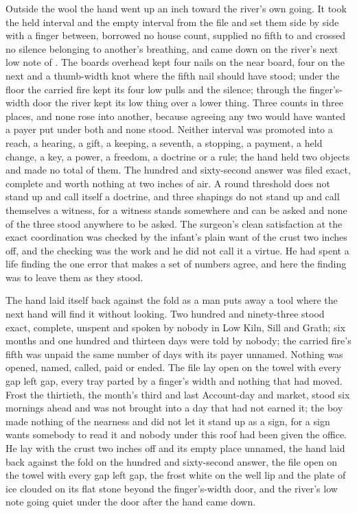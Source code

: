 \scenebreak

Outside the wool the hand went up an inch toward the river's own going. It took the held interval and the empty interval from the file and set them side by side with a finger between, borrowed no house count, supplied no fifth to  and crossed no silence belonging to another's breathing, and came down on the river's next low note of . The boards overhead kept four nails on the near board, four on the next and a thumb-width knot where the fifth nail should have stood; under the floor the carried fire kept its four low pulls and the silence; through the finger's-width door the river kept its low thing over a lower thing. Three counts in three places, and none rose into another, because agreeing any two would have wanted a payer put under both and none stood. Neither interval was promoted into a reach, a hearing, a gift, a keeping, a seventh, a stopping, a payment, a held change, a key, a power, a freedom, a doctrine or a rule; the hand held two objects and made no total of them. The hundred and sixty-second answer was filed exact, complete and worth nothing at two inches of air. A round threshold does not stand up and call itself a doctrine, and three shapings do not stand up and call themselves a witness, for a witness stands somewhere and can be asked and none of the three stood anywhere to be asked. The surgeon's clean satisfaction at the exact coordination was checked by the infant's plain want of the crust two inches off, and the checking was the work and he did not call it a virtue. He had spent a life finding the one error that makes a set of numbers agree, and here the finding was to leave them as they stood.

The hand laid itself back against the fold as a man puts away a tool where the next hand will find it without looking. Two hundred and ninety-three stood exact, complete, unspent and spoken by nobody in Low Kiln, Sill and Grath; six months and one hundred and thirteen days were told by nobody; the carried fire's fifth was unpaid the same number of days with its payer unnamed. Nothing was opened, named, called, paid or ended. The file lay open on the towel with every gap left gap, every tray parted by a finger's width and nothing that had moved. Frost the thirtieth, the month's third and last Account-day and market, stood six mornings ahead and was not brought into a day that had not earned it; the boy made nothing of the nearness and did not let it stand up as a sign, for a sign wants somebody to read it and nobody under this roof had been given the office. He lay with the crust two inches off and its empty place unnamed, the hand laid back against the fold on the hundred and sixty-second answer, the file open on the towel with every gap left gap, the frost white on the well lip and the plate of ice clouded on its flat stone beyond the finger's-width door, and the river's low note going quiet under the door after the hand came down.
